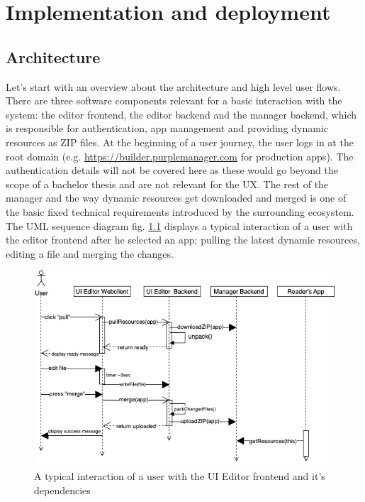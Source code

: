 
%
\chapter{Implementation and deployment}
\label{chap:impl} 



\section{Architecture}

Let's start with an overview about the architecture and high level user flows.
There are three software components relevant for a basic interaction with the system: the editor frontend, the editor backend and the \Gls{manager} backend, which is responsible for
authentication, app management and providing dynamic resources as ZIP files.
At the beginning of a user journey, the user logs in at the root domain (e.g. \url{https://builder.purplemanager.com} for production apps).
The authentication details will not be covered here as these would go beyond the scope of a bachelor thesis and are not relevant for the UX.
The \Gls{rest} of the \Gls{manager} and the way dynamic resources get downloaded and merged is one of the basic fixed technical requirements introduced by the surrounding ecosystem.
\\
The UML sequence diagram fig. \ref{fig:userflow} displays a typical interaction of a user with the editor frontend after he selected an app; pulling the latest dynamic resources, editing a file and merging the changes.
\begin{figure}[h!]
  \includegraphics[width=\textwidth]{pics/user-flow.uml.drawio.png}
  \caption{A typical interaction of a user with the UI Editor frontend and it's dependencies}
  \label{fig:userflow}
\end{figure}
\pagebreak
